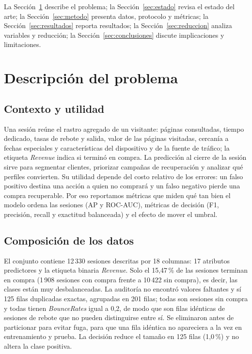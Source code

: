 \documentclass[journal]{IEEEtran}
\begin{document}
La Sección~\ref{sec:problema} describe el problema; la Sección~\ref{sec:estado} revisa el
estado del arte; la Sección~\ref{sec:metodo} presenta datos, protocolo y métricas; la
Sección~\ref{sec:resultados} reporta resultados; la Sección~\ref{sec:reduccion} analiza
variables y reducción; la Sección~\ref{sec:conclusiones} discute implicaciones y
limitaciones.

\section{Descripción del problema}
\label{sec:problema}

\subsection{Contexto y utilidad}

Una sesión reúne el rastro agregado de un visitante: páginas consultadas, tiempo dedicado,
tasas de rebote y salida, valor de las páginas visitadas, cercanía a fechas especiales y
características del dispositivo y de la fuente de tráfico; la etiqueta \textit{Revenue}
indica si terminó en compra. La predicción al cierre de la sesión sirve para segmentar clientes,
priorizar campañas de recuperación y analizar qué perfiles convierten. Su utilidad depende
del costo relativo de los errores: un falso positivo destina una acción a quien no comprará
y un falso negativo pierde una compra recuperable. Por eso reportamos métricas que miden qué tan bien el modelo ordena las sesiones
(AP y ROC-AUC), métricas de decisión (F1, precisión, recall y exactitud balanceada) y el efecto de
mover el umbral.

\subsection{Composición de los datos}

El conjunto contiene 12\,330 sesiones descritas por 18 columnas: 17 atributos predictores
y la etiqueta binaria \textit{Revenue}. Solo el 15,47\,\% de las sesiones terminan en compra
(1\,908 sesiones con compra frente a 10\,422 sin compra), es decir, las clases están
muy desbalanceadas. La auditoría no encontró valores faltantes y sí 125 filas duplicadas exactas,
agrupadas en 201 filas; todas son sesiones sin compra y todas tienen
\textit{BounceRates} igual a 0,2, de modo que son filas idénticas de sesiones de rebote
que no pueden distinguirse entre sí. Se eliminaron antes de particionar para evitar
fuga, para que una fila idéntica no apareciera a la vez en entrenamiento y prueba. La decisión reduce el tamaño en 125
filas (1,0\,\%) y no altera la clase positiva.
\end{document}
